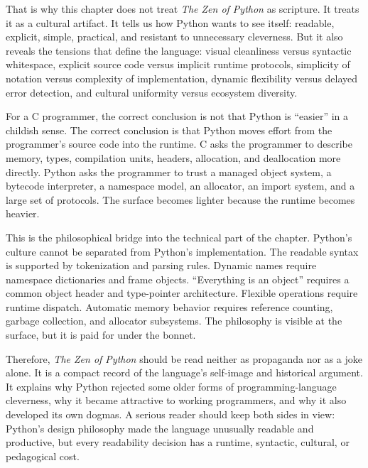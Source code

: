 That is why this chapter does not treat \emph{The Zen of Python} as scripture. It treats it as a cultural artifact. It tells us how Python wants to see itself: readable, explicit, simple, practical, and resistant to unnecessary cleverness. But it also reveals the tensions that define the language: visual cleanliness versus syntactic whitespace, explicit source code versus implicit runtime protocols, simplicity of notation versus complexity of implementation, dynamic flexibility versus delayed error detection, and cultural uniformity versus ecosystem diversity.

For a C programmer, the correct conclusion is not that Python is “easier” in a childish sense. The correct conclusion is that Python moves effort from the programmer's source code into the runtime. C asks the programmer to describe memory, types, compilation units, headers, allocation, and deallocation more directly. Python asks the programmer to trust a managed object system, a bytecode interpreter, a namespace model, an allocator, an import system, and a large set of protocols. The surface becomes lighter because the runtime becomes heavier.

This is the philosophical bridge into the technical part of the chapter. Python's culture cannot be separated from Python's implementation. The readable syntax is supported by tokenization and parsing rules. Dynamic names require namespace dictionaries and frame objects. “Everything is an object” requires a common object header and type-pointer architecture. Flexible operations require runtime dispatch. Automatic memory behavior requires reference counting, garbage collection, and allocator subsystems. The philosophy is visible at the surface, but it is paid for under the bonnet.

Therefore, \emph{The Zen of Python} should be read neither as propaganda nor as a joke alone. It is a compact record of the language’s self-image and historical argument. It explains why Python rejected some older forms of programming-language cleverness, why it became attractive to working programmers, and why it also developed its own dogmas. A serious reader should keep both sides in view: Python’s design philosophy made the language unusually readable and productive, but every readability decision has a runtime, syntactic, cultural, or pedagogical cost.